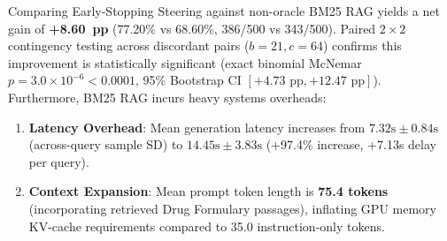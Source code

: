 \documentclass[conference]{IEEEtran}
\begin{document}
Comparing Early-Stopping Steering against non-oracle BM25 RAG yields a net gain of \textbf{+8.60~pp} (77.20\% vs 68.60\%, 386/500 vs 343/500). Paired $2\times 2$ contingency testing across discordant pairs ($b=21, c=64$) confirms this improvement is statistically significant (exact binomial McNemar $p = 3.0 \times 10^{-6} < 0.0001$, 95\% Bootstrap CI $[+4.73\text{ pp}, +12.47\text{ pp}]$). Furthermore, BM25 RAG incurs heavy systems overheads:
\begin{enumerate}
    \item \textbf{Latency Overhead}: Mean generation latency increases from $7.32\text{s} \pm 0.84\text{s}$ (across-query sample SD) to \textbf{$14.45\text{s} \pm 3.83\text{s}$} (+97.4\% increase, +7.13s delay per query).
    \item \textbf{Context Expansion}: Mean prompt token length is \textbf{75.4 tokens} (incorporating retrieved Drug Formulary passages), inflating GPU memory KV-cache requirements compared to 35.0 instruction-only tokens.
\end{enumerate}

\begin{table}[htbp]
\caption{Empirical Comparison Against Directional Controls and Real BM25 RAG Baseline ($N_{\text{test}}=500$, \texttt{max\_new\_tokens=200})}
\label{tab:baselines}
\centering
{}
\end{table}
\end{document}
